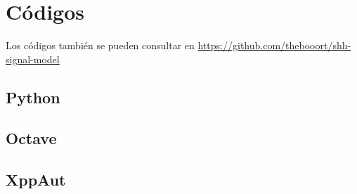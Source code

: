 \chapter{Códigos}
Los códigos también se pueden consultar en \url{https://github.com/thebooort/shh-signal-model}
\section{Python}









\section{Octave}


\section{XppAut}



